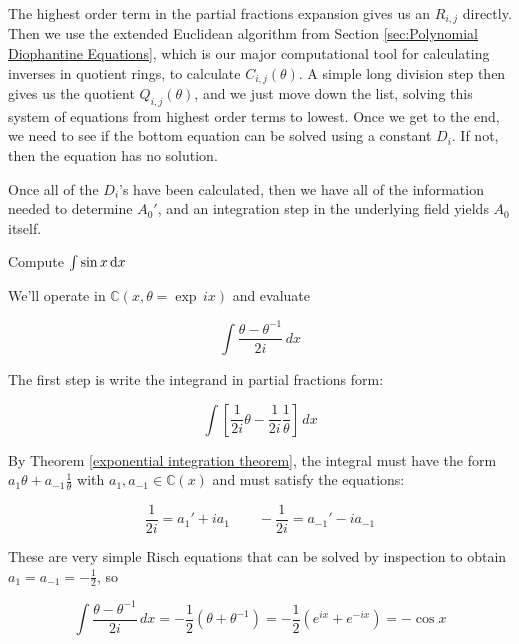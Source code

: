 The highest order term in the partial fractions expansion
gives us an $R_{i,j}$ directly.  Then we use
the extended Euclidean algorithm from
Section \ref{sec:Polynomial Diophantine Equations}, which is our major
computational tool for calculating inverses in quotient rings,
to calculate $C_{i,j}(\theta)$.  A simple long division step
then gives us the quotient $Q_{i,j}(\theta)$, and we just
move down the list, solving this system of equations from highest
order terms to lowest.  Once we get to the end, we need to see if the
bottom equation can be solved using a constant $D_i$.  If not,
then the equation has no solution.

Once all of the $D_i$'s have been calculated, then we have all of the
information needed to determine $A_0'$, and an integration step in the
underlying field yields $A_0$ itself.


\begin{comment}
$$F' = \sum_{i=-l}^n (c_i' + i c_i k' )\theta^i
  + \sum_{i=1}^\nu \sum_{j=1}^{m_i} \frac{b_{ij}'(\theta) n_i(\theta) - j b_{ij}(\theta) n_i'(\theta) }{n_i(\theta)^{j+1}}
  + \sum_{i=1}^\eta d_i \frac{n_i(\theta)'}{n_i(\theta)}$$
\end{comment}

\vfil\eject

\example Compute $\int \sin x \, {\rm d}x$

We'll operate in ${\mathbb C}(x, \theta = \exp \,ix)$ and evaluate

$$\int \frac{\theta - \theta^{-1}}{2i} \,dx$$

The first step is write the integrand in partial fractions form:

$$\int \left[ \frac{1}{2i} \theta - \frac{1}{2i} \frac{1}{\theta} \right] \,dx $$

By Theorem \ref{exponential integration theorem}, the integral must have the
form $a_1 \theta + a_{-1} \frac{1}{\theta}$ with $a_1, a_{-1} \in {\mathbb
C}(x)$ and must satisfy the equations:

$$\frac{1}{2i} = a_1' + i a_1 \qquad - \frac{1}{2i} = a_{-1}' - i a_{-1}$$ 

These are very simple Risch equations that can be solved by inspection
to obtain $a_1 = a_{-1} = -\frac{1}{2}$, so

$$\int \frac{\theta - \theta^{-1}}{2i} \,dx = -\frac{1}{2}(\theta + \theta^{-1})
 = -\frac{1}{2}(e^{ix} + e^{-ix}) = -\cos x$$

\endexample

\vfil\eject

